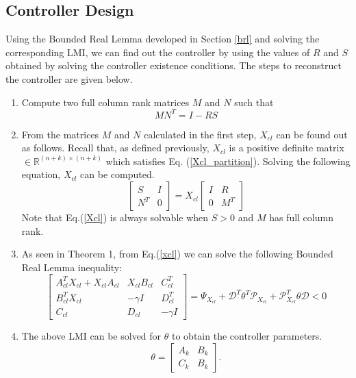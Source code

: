 \documentclass[a4paper,12pt]{article}
\begin{document}
	 \subsection{Controller Design}
	 Using the Bounded Real Lemma developed in Section \ref{brl} and solving the corresponding LMI, we can find out the controller by using the values of $R$ and $S$ obtained by solving the controller existence conditions. The steps to reconstruct the controller are given below.
	 \begin{enumerate}
	 \item Compute two full column rank matrices $M$ and $N$ such that
	 \begin{equation}
	 MN^{T} = I - RS
	 \end{equation}
	 \item From the matrices $M$ and $N$ calculated in the first step, $X_{cl}$ can be found out as follows. Recall that, as defined previously, $X_{cl}$ is a positive definite matrix $\in \mathbb{R}^{(n+k) \times (n+k)}$ which satisfies Eq. (\ref{Xcl_partition}). Solving the following equation, $X_{cl}$ can be computed.
	 \begin{equation}
	 \begin{bmatrix}
	 S & I \\ N^{T} & 0
	 \end{bmatrix}
	 =
	 X_{cl}\begin{bmatrix}
	 I & R \\
	 0 & M^{T}
	 \end{bmatrix}
	 \label{Xcl}
	 \end{equation}
	 Note that Eq.(\ref{Xcl}) is always solvable when $S>0$ and $M$ has full column rank. 
	\item As seen in Theorem 1, from Eq.(\ref{xcl}) we can solve the following Bounded Real Lemma inequality:
	\begin{equation}
		\begin{bmatrix}
			A_{cl}^{T}X_{cl}+X_{cl}A_{cl} & X_{cl}B_{cl} & C_{cl}^{T} \\
			B_{cl}^{T}X_{cl} & -\gamma I & D_{cl}^{T} \\
			C_{cl} & D_{cl} & -\gamma I
		\end{bmatrix}
		=\Psi_{X_{cl}} + \mathscr{D}^{T}\theta^{T}\mathscr{P}_{X_{cl}}+\mathscr{P}_{X_{cl}}^{T}\theta\mathscr{D} <0
		\end{equation}
	\item The above LMI can be solved for $\theta$ to obtain the controller parameters. 
	\begin{equation}
	\theta = \begin{bmatrix}
	A_{k} & B_{k} \\
	C_{k} & B_{k}
	\end{bmatrix}.
	\end{equation}
	 \end{enumerate}
	 
\end{document}
